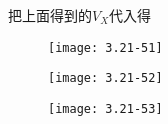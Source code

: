 把上面得到的$V_X$代入得

\begin{figure}[H] %
	\begin{minipage}{\linewidth}
		\texttt{[image: 3.21-51]}
	\end{minipage}
\end{figure}

\begin{figure}[H] %
	\begin{minipage}{\linewidth}
		\texttt{[image: 3.21-52]}
	\end{minipage}
\end{figure}

\begin{figure}[H] %
	\begin{minipage}{\linewidth}
		\texttt{[image: 3.21-53]}
	\end{minipage}
\end{figure}

